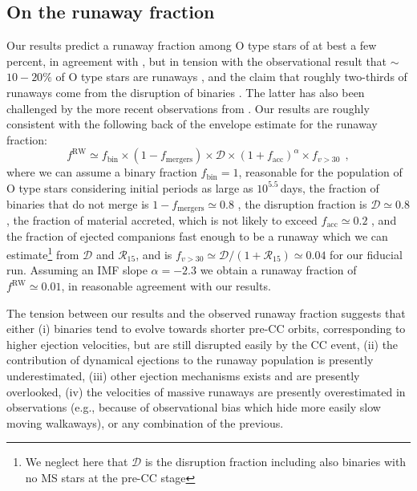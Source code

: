 \documentclass{aa}
\begin{document}
\subsection{On the runaway fraction}
\label{sec:howtofind}
Our results predict a runaway fraction among O type stars of at best a
few percent, in agreement with \cite{eldridge:11}, but in tension with
the observational result that 
$\sim$$10-20\%$ of O type stars are runaways \citep[][Sana et al., in
preparation]{blaauw:61, gies:87, stone:91, tetzlaff:11, maiz-appellaniz:18}, and the claim
that roughly two-thirds of runaways come from the
disruption of binaries \citep[][]{hoogerwerf:01}. The latter has also been
challenged by the more recent observations from \cite{jilinski:10}.
Our results are roughly consistent with the following back of the
envelope estimate for the runaway fraction:
\begin{equation}
  \label{eq:ratios}
  f^\mathrm{RW} \simeq
  f_\mathrm{bin}\times(1-f_\mathrm{mergers})\times\mathcal{D}\times
  (1+f_\mathrm{acc})^{\alpha}\times f_{v>30} \ \ ,  %
\end{equation}
where we can assume a binary fraction $f_\mathrm{bin}=1$, reasonable
for the population of O type stars considering initial periods as
large as $10^{5.5}$\,days, the fraction of binaries that do not merge is
$1-f_\mathrm{mergers}\simeq0.8$ \citep[][]{sana:12}, the disruption
fraction is $\mathcal{D}\simeq0.8$ \citep[this study, but also,
e.g.,][]{eldridge:11}, the fraction of material accreted, which is not
likely to exceed $f_\mathrm{acc}\simeq 0.2$ \citep[][]{packet:81}, and the
fraction of ejected companions fast enough to be a runaway which we
can estimate\footnote{We neglect here that $\mathcal{D}$ is the
  disruption fraction including also binaries with no MS stars at the
  pre-CC stage} from $\mathcal{D}$ and $\mathcal{R}_{15}$, and is
$f_{v>30}\simeq \mathcal{D}/(1+\mathcal{R}_{15})\simeq0.04$ for our fiducial run. Assuming an IMF slope $\alpha=-2.3$ we obtain a
runaway fraction of $f^\mathrm{RW}\simeq 0.01$, in reasonable
agreement with our results. 

The tension between our results and the observed runaway fraction suggests that either (i)
binaries tend to evolve towards shorter pre-CC orbits, corresponding
to higher ejection velocities, but are still disrupted easily by the
CC event, (ii) the contribution of dynamical ejections to the runaway
population is presently underestimated, (iii) other ejection
mechanisms exists and are presently overlooked, (iv) the velocities of
massive runaways are presently overestimated in observations (e.g.,
because of observational bias which hide more easily slow moving walkaways), or any
combination of the previous. 
\end{document}
